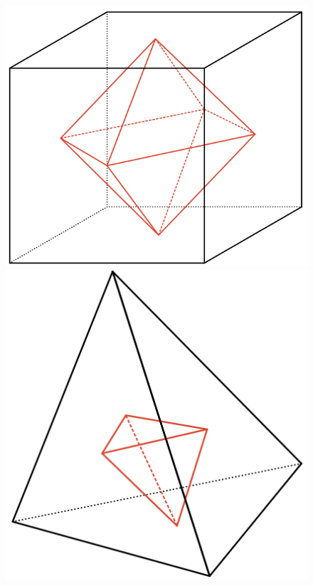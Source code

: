 \begin{figure}[H]
    \hfill
    \begin{minipage}{0.35\textwidth}
    \includegraphics[width=\textwidth]{images/cube_dual.png}
    \end{minipage}
    \hfill
    \begin{minipage}{0.25\textwidth}
    \includegraphics[width=\textwidth]{images/tetr_dual.png}
    \end{minipage}
    \hfill\hfill
\end{figure}\V

